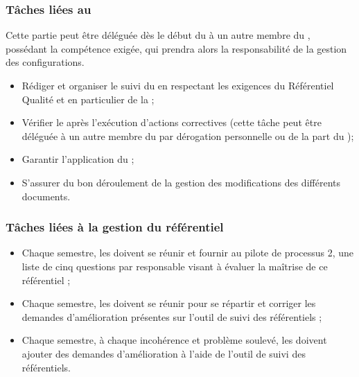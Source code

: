 \subsubsection*{Tâches liées au \PGCCourt}

Cette partie peut être déléguée dès le début du \PICCourt{} à un autre membre du \PICCourt{}, possédant la compétence exigée, qui prendra alors la responsabilité de la gestion des configurations.

\begin{itemize}
	\item Rédiger et organiser le suivi du \PGCCourt{} en respectant les exigences du Référentiel Qualité et en particulier de la \DGQDEUXCourt;


	\item Vérifier le \PGCCourt{} après l’exécution d’actions correctives (cette tâche peut être déléguée à un autre membre du \PICCourt{} par dérogation personnelle ou de la part du \CP);

	\item Garantir l’application du \PGCCourt;
	\item S’assurer du bon déroulement de la gestion des modifications des différents documents.
\end{itemize}

\subsubsection*{Tâches liées à la gestion du référentiel}

\begin{itemize}

	\item Chaque semestre, les \RQs{} doivent se réunir et fournir au pilote de processus 2, une liste de cinq questions par responsable visant à évaluer la maîtrise de ce référentiel ;

	\item Chaque semestre, les \RQs{} doivent se réunir pour se répartir et corriger les demandes d’amélioration présentes sur l’outil de suivi des référentiels ;
	\item Chaque semestre, à chaque incohérence et problème soulevé, les \RQs{} doivent ajouter des demandes d’amélioration à l’aide de l’outil de suivi des référentiels.
\end{itemize}
